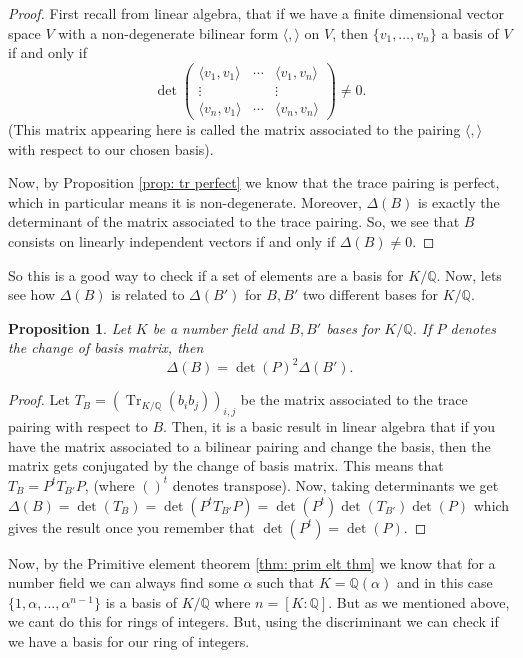 \documentclass[11pt,a4paper]{report}
\theoremstyle{plain}
\newtheorem{prop}[subsection]{Proposition}
\theoremstyle{definition}
\theoremstyle{definition}
\newcommand{\Tr}{\operatorname{Tr}}
\def\QQ{\mathbb{Q}}
\def \a{\alpha}
\begin{document}
	\begin{proof}
		First recall from linear algebra, that if we have a finite dimensional vector space $V$ with a non-degenerate bilinear form $\langle, \rangle$ on $V$, then $\{v_1,\dots,v_n\}$ a basis of $V$ if and only if \[\det  \left (\begin{matrix} \langle v_1, v_1 \rangle  &\cdots& \langle v_1,v_n \rangle \\ \vdots & & \vdots \\  \langle v_n,v_1\rangle &\cdots& \langle v_n,v_n\rangle
		\end{matrix} \right ) \neq 0.\] (This matrix appearing here is called the matrix associated to the pairing $\langle,\rangle$ with respect to our chosen basis).
		
		Now, by Proposition \ref{prop: tr perfect} we know that the trace pairing is perfect, which in particular means it is non-degenerate. Moreover, $\Delta(B)$ is exactly the determinant of the matrix associated to the trace pairing. So, we see that  $B$ consists on linearly independent vectors if and only if $\Delta(B) \neq 0$.
	\end{proof}
	So this is a good way to check if a set of elements are a basis for $K/\QQ$. Now, lets see how $\Delta(B)$ is related to $\Delta(B')$ for $B,B'$ two different bases for $K/\QQ$.
	
	\begin{prop}\label{prop: disc change of basis}
		Let $K$ be a number field and $B,B'$ bases for $K/\QQ$. If $P$ denotes the change of basis matrix, then \[\Delta(B)=\det(P)^2 \Delta(B').\]
	\end{prop}
	
	\begin{proof}
		Let $T_B=(\Tr_{K/\QQ}(b_i b_j))_{i,j}$ be the matrix associated to the trace pairing with respect to $B$. Then, it is a basic result in linear algebra that if you have the matrix associated to a bilinear pairing and change the basis, then the matrix gets conjugated by the change of basis matrix. This means that $T_B=P^{t}T_{B'}P$, (where $()^t$ denotes transpose). Now, taking determinants we get $\Delta(B)=\det(T_B)=\det(P^t T_{B'}P)=\det(P^t)\det(T_{B'})\det(P)$ which gives the result once you remember that $\det(P^t)=\det(P)$. 
	\end{proof}
	
	
	Now, by the Primitive element theorem \ref{thm: prim elt thm} we know that for a number field we can always find some $\a$ such that $K=\QQ(\a)$ and in this case $\{1,\a,\dots,\a^{n-1}\}$ is a basis of $K/\QQ$ where $n=[K:\QQ]$. But as we mentioned above, we cant do this for rings of integers. But, using the discriminant we can check if we have a basis for our ring of integers.
	
\end{document}
